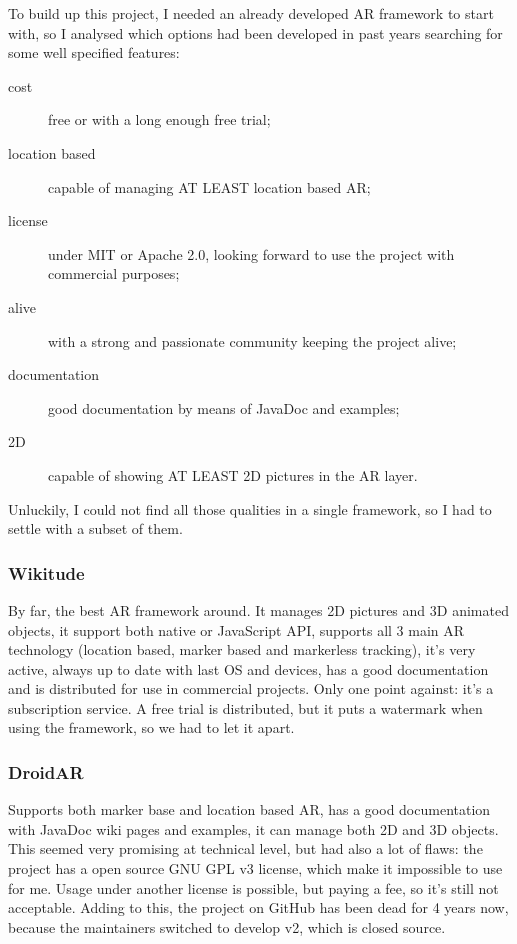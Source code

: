 			To build up this project, I needed an already developed AR framework to start with, so I analysed which options had been developed in past years searching for some well specified features:
			
			\begin{description}
				\item[cost] free or with a long enough free trial;
				\item[location based] capable of managing AT LEAST location based AR;
				\item[license] under MIT or Apache 2.0, looking forward to use the project with commercial purposes;
				\item[alive] with a strong and passionate community keeping the project alive;
				\item[documentation] good documentation by means of JavaDoc and examples;
				\item[2D] capable of showing AT LEAST 2D pictures in the AR layer.
			\end{description}
			
			Unluckily, I could not find all those qualities in a single framework, so I had to settle with a subset of them.
			
			\subsubsection{Wikitude}
			
				By far, the best AR framework around. It manages 2D pictures and 3D animated objects, it support both native or JavaScript API, supports all 3 main AR technology (location based, marker based and markerless tracking), it's very active, always up to date with last OS and devices, has a good documentation and is distributed for use in commercial projects.
				Only one point against: it's a subscription service.
				A free trial is distributed, but it puts a watermark when using the framework, so we had to let it apart.
			
			\subsubsection{DroidAR}
				
				Supports both marker base and location based AR, has a good documentation with JavaDoc wiki pages and examples, it can manage both 2D and 3D objects.
				This seemed very promising at technical level, but had also a lot of flaws: the project has a open source GNU GPL v3 license, which make it impossible to use for me. Usage under another license is possible, but paying a fee, so it's still not acceptable.
				Adding to this, the project on GitHub has been dead for 4 years now, because the maintainers switched to develop v2, which is closed source.
			
